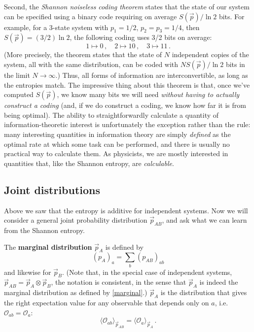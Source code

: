 \documentclass[11pt]{article}
\newcommand{\ev}[1]{\langle{#1}\rangle}
\newcommand{\OO}{\mathcal{O}}
\begin{document}
Second, the \emph{Shannon noiseless coding theorem} states that the state of our system can be specified using a binary code requiring on average $S(\vec p)/\ln 2$ bits. For example, for a 3-state system with $p_1=1/2$, $p_2=p_3=1/4$, then $S(\vec p)=(3/2)\ln2$, the following coding uses 3/2 bits on average:
\begin{equation}
1\mapsto0\,,\quad
2\mapsto10\,,\quad
3\mapsto11\,.
\end{equation}
(More precisely, the theorem states that the state of $N$ independent copies of the system, all with the same distribution, can be coded with $NS(\vec p)/\ln 2$ bits in the limit $N\to\infty$.) Thus, all forms of information are interconvertible, as long as the entropies match. The impressive thing about this theorem is that, once we've computed $S(\vec p)$, we know many bits we will need \emph{without having to actually construct a coding} (and, if we do construct a coding, we know how far it is from being optimal). The ability to straightforwardly calculate a quantity of information-theoretic interest is unfortunately the exception rather than the rule: many interesting quantities in information theory are simply \emph{defined} as the optimal rate at which some task can be performed, and there is usually no practical way to calculate them. As physicists, we are mostly interested in quantities that, like the Shannon entropy, are \emph{calculable}.


\subsection{Joint distributions}

Above we saw that the entropy is additive for independent systems. Now we will consider a general joint probability distribution $\vec p_{AB}$, and ask what we can learn from the Shannon entropy.

The \textbf{marginal distribution} $\vec p_A$ is defined by
\begin{equation}\label{marginal}
(p_A)_a = \sum_b(p_{AB})_{ab}
\end{equation}
and likewise for $\vec p_B$. (Note that, in the special case of independent systems, $\vec p_{AB}=\vec p_A\otimes\vec p_B$, the notation is consistent, in the sense that $\vec p_A$ is indeed the marginal distribution as defined by \eqref{marginal}.) $\vec p_A$ is the distribution that gives the right expectation value for any observable that depends only on $a$, i.e.\ $\OO_{ab}=\OO_a$:
\begin{equation}
\ev{\OO_{ab}}_{\vec p_{AB}} = \ev{\OO_a}_{\vec p_A}\,.
\end{equation}
\end{document}

